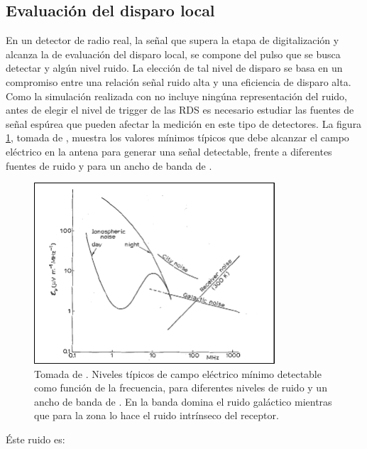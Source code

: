 	\subsection{Evaluaci\'on del disparo local}
	\label{sbsc:localTriggerRadio}
	En un detector de radio real, la se\~nal que supera la etapa de digitalizaci\'on y alcanza la de evaluaci\'on del disparo local, se compone del pulso que se busca detectar y alg\'un nivel ruido.
	La elecci\'on de tal nivel de disparo se basa en un compromiso entre una relaci\'on se\~nal ruido alta y una eficiencia de disparo alta.
	Como la simulaci\'on realizada con \zhs{} no incluye ning\'una representaci\'on del ruido, antes de elegir el nivel de trigger de las RDS es necesario estudiar las fuentes de se\~nal esp\'urea que pueden afectar la medici\'on en este tipo de detectores.
	La figura \ref{fig:allanNoise}, tomada de \cite{allan1971}, muestra los valores m\'inimos t\'ipicos que debe alcanzar el campo el\'ectrico en la antena para generar una se\~nal detectable, frente a diferentes fuentes de ruido y para un ancho de banda de .
	\begin{figure}[ht!]
		\centering
		\includegraphics[width=0.8\textwidth]{./fig/simulacionRadio/allanNoise}
		\caption{\label{fig:allanNoise}
		Tomada de \cite{allan1971}. Niveles t\'ipicos de campo el\'ectrico m\'inimo detectable como funci\'on de la frecuencia, para diferentes niveles de ruido y un ancho de banda de .
		En la banda  domina el ruido gal\'actico mientras que para la zona  lo hace el ruido intr\'inseco del receptor.
		}
	\end{figure}
	\'Este ruido es:
